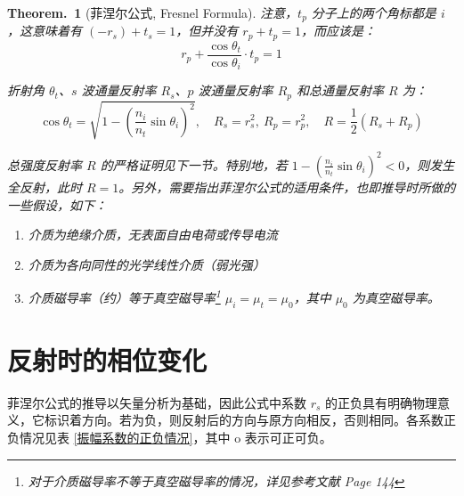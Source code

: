 \documentclass[UTF8]{report}
\theoremstyle{MyLineTheoremStyle} %
\theoremstyle{MyBlockTheoremStyle} %
\newtheorem{BlockTheorem}[LineTheorem]{Theorem.\,} %
\theoremstyle{MySubsubsectionStyle} %
\begin{document}
\begin{BlockTheorem}[菲涅尔公式, Fresnel Formula]
注意，$t_p$ 分子上的两个角标都是 $i$，这意味着有 $(-r_s) + t_s = 1$，但并没有 $r_p + t_p = 1$，而应该是：
\begin{equation}
    r_p + \frac{\cos \theta_t}{\cos \theta_i}\cdot t_p = 1
\end{equation}

折射角 $\theta_t$、$s$ 波通量反射率 $R_s$、$p$ 波通量反射率 $R_p$ 和总通量反射率 $R$ 为：
\begin{equation}
    \cos \theta_t = \sqrt{1 - \left( \frac{n_i}{n_t} \sin \theta_i\right)^2},\quad R_s = r_s^2,\ R_p = r_p^2, \quad  R = \frac{1}{2}\left( R_s + R_p \right)
\end{equation}

总强度反射率 $R$ 的严格证明见下一节。特别地，若 $1 - \left( \frac{n_i}{n_t} \sin \theta_i\right)^2 < 0$，则发生全反射，此时 $R = 1$。另外，需要指出菲涅尔公式的适用条件，也即推导时所做的一些假设，如下：
\begin{enumerate}
\item 介质为绝缘介质，无表面自由电荷或传导电流
\item 介质为各向同性的光学线性介质（弱光强）
\item 介质磁导率（约）等于真空磁导率\footnote{对于介质磁导率不等于真空磁导率的情况，详见参考文献 \cite{Optics} Page 144} $\mu_i = \mu_t = \mu_0$，其中 $\mu_0$ 为真空磁导率。
\end{enumerate}
\end{BlockTheorem}

\section{反射时的相位变化}

菲涅尔公式的推导以矢量分析为基础，因此公式中系数 $r_s$ 的正负具有明确物理意义，它标识着方向。若为负，则反射后的方向与原方向相反，否则相同。各系数正负情况见表 \ref{振幅系数的正负情况}，其中 o 表示可正可负。

\end{document}
